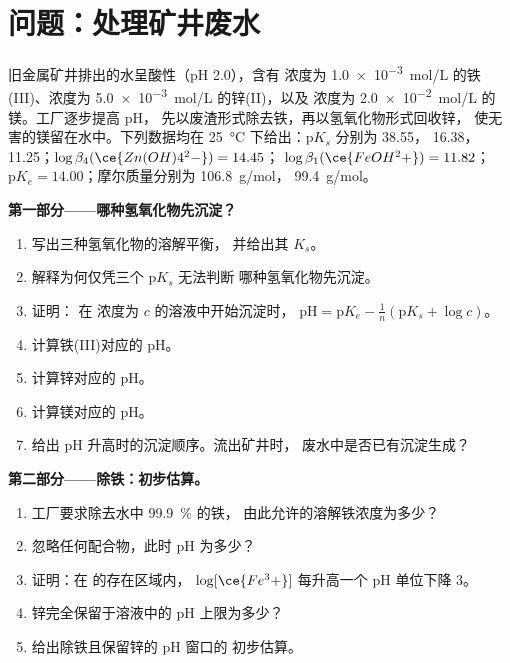 \section{问题：处理矿井废水}

\begin{problem}
\label{pb:b1:precipitation:1}
旧金属矿井排出的水呈酸性（pH 2.0），含有
浓度为 \qty{1.0e-3}{mol/L} 的铁(III)、浓度为 \qty{5.0e-3}{mol/L} 的锌(II)，以及
浓度为 \qty{2.0e-2}{mol/L} 的镁。工厂逐步提高 pH，
先以废渣形式除去铁，再以氢氧化物形式回收锌，
使无害的镁留在水中。下列数据均在
\qty{25}{\celsius} 下给出：$\mathrm{p}K_s$ 分别为  38.55，
16.38， 11.25；$\log\beta_4(\ce{Zn(OH)4^2-}) = 14.45$；
$\log\beta_1(\ce{FeOH^2+}) = 11.82$；$\mathrm{p}K_e = 14.00$；摩尔质量分别为
 \qty{106.8}{g/mol}， \qty{99.4}{g/mol}。

\medskip
\noindent\textbf{第一部分——哪种氢氧化物先沉淀？}
\begin{enumerate}
  \item 写出三种氢氧化物的溶解平衡，
        并给出其 $K_s$。
  \item 解释为何仅凭三个 $\mathrm{p}K_s$ 无法判断
        哪种氢氧化物先沉淀。
  \item 证明： 在  浓度为 $c$ 的溶液中开始沉淀时，
        $\mathrm{pH} = \mathrm{p}K_e -
        \frac1n(\mathrm{p}K_s + \log c)$。
  \item 计算铁(III)对应的 pH。
  \item 计算锌对应的 pH。
  \item 计算镁对应的 pH。
  \item 给出 pH 升高时的沉淀顺序。流出矿井时，
        废水中是否已有沉淀生成？
\end{enumerate}

\medskip
\noindent\textbf{第二部分——除铁：初步估算。}
\begin{enumerate}[resume]
  \item 工厂要求除去水中 \qty{99.9}{\percent} 的铁，
        由此允许的溶解铁浓度为多少？
  \item 忽略任何配合物，此时 pH 为多少？
  \item 证明：在  的存在区域内，
        $\log[\ce{Fe^3+}]$ 每升高一个 pH 单位下降 3。
  \item 锌完全保留于溶液中的 pH 上限为多少？
  \item 给出除铁且保留锌的 pH 窗口的
        初步估算。
\end{enumerate}


\end{problem}
